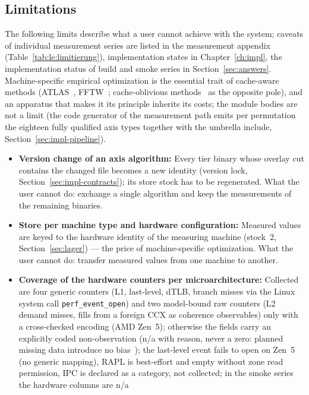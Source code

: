 \begin{nurkurz}
\section{Limitations}\label{sec:limitations}
The following limits describe what a user cannot achieve with the system; caveats of individual
measurement series are listed in the measurement appendix (Table~\ref{tab:le:limitierung}), implementation
states in Chapter~\ref{ch:impl}, the implementation status of build and smoke series in
Section~\ref{sec:answers}. Machine-specific empirical optimization is the essential trait of cache-aware
methods (ATLAS~\cite{whaley2001atlas}, FFTW~\cite{frigo1998fftw}; cache-oblivious
methods~\cite{frigo1999cache} as the opposite pole), and an apparatus that makes it its principle inherits
its costs; the module bodies are not a limit (the code generator of the measurement path emits per
permutation the eighteen fully qualified axis types together with the umbrella include,
Section~\ref{sec:impl-pipeline}).
\begin{itemize}
  \item \textbf{Version change of an axis algorithm:} Every tier binary whose overlay cut contains the
  changed file becomes a new identity (version lock, Section~\ref{sec:impl-contracts}); its store stock
  has to be regenerated. What the user cannot do: exchange a single algorithm and keep the measurements of
  the remaining binaries.
  \item \textbf{Store per machine type and hardware configuration:} Measured values are keyed to the
  hardware identity of the measuring machine (stock~2, Section~\ref{sec:lager}) --- the price of
  machine-specific optimization. What the user cannot do: transfer measured values from one machine to
  another.
  \item \textbf{Coverage of the hardware counters per microarchitecture:} Collected are four generic
  counters (L1, last-level, dTLB, branch misses via the Linux system call \texttt{perf\_event\_open}) and
  two model-bound raw counters (L2 demand misses, fills from a foreign CCX as coherence observables) only
  with a cross-checked encoding (AMD Zen~5); otherwise the fields carry an explicitly coded
  non-observation (n/a with reason, never a zero: planned missing data introduce no
  bias~\cite{graham2006planned,graham2009missing}); the last-level event fails to open on Zen~5 (no
  generic mapping), RAPL is best-effort and empty without zone read permission, IPC is declared as a
  category, not collected; in the smoke series the hardware columns are n/a

\end{itemize}
\end{nurkurz}
